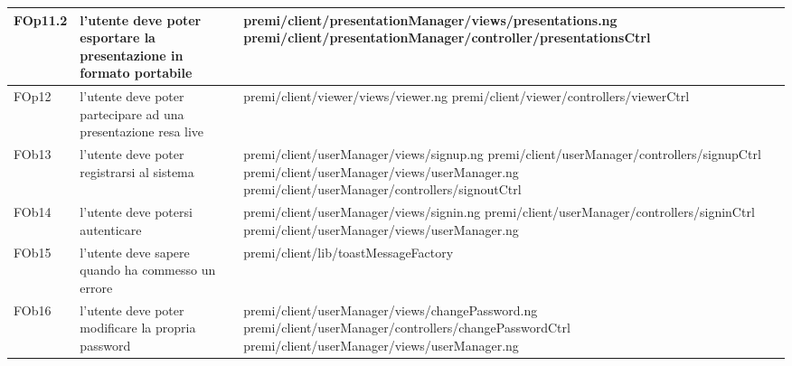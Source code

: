 \begin{longtable}{|l|p{5cm}|p{7cm}|}
\hline
FOp11.2 & l'utente deve poter esportare la presentazione in formato portabile & \hspace{0pt}premi/client/presentationManager/views/presentations.ng \linebreak \linebreak premi/client/presentationManager/controller/presentationsCtrl \\
\hline
FOp12 & l'utente deve poter partecipare ad una presentazione resa live & \hspace{0pt}premi/client/viewer/views/viewer.ng \linebreak \linebreak premi/client/viewer/controllers/viewerCtrl \\
\hline
FOb13 & l'utente deve poter registrarsi al sistema & \hspace{0pt}premi/client/userManager/views/signup.ng \linebreak \linebreak premi/client/userManager/controllers/signupCtrl \linebreak \linebreak premi/client/userManager/views/userManager.ng \linebreak \linebreak premi/client/userManager/controllers/signoutCtrl \\
\hline
FOb14 & l'utente deve potersi autenticare & \hspace{0pt}premi/client/userManager/views/signin.ng \linebreak \linebreak premi/client/userManager/controllers/signinCtrl \linebreak \linebreak premi/client/userManager/views/userManager.ng \\
\hline
FOb15 & l'utente deve sapere quando ha commesso un errore & \hspace{0pt}premi/client/lib/toastMessageFactory \\
\hline
FOb16 & l'utente deve poter modificare la propria password & \hspace{0pt}premi/client/userManager/views/changePassword.ng \linebreak \linebreak premi/client/userManager/controllers/changePasswordCtrl \linebreak \linebreak premi/client/userManager/views/userManager.ng \\

\end{longtable}
